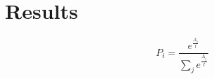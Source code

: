\thispagestyle{empty}
\pagestyle{empty}
\section{Results}


\begin{equation}\label{eq:prob}
P_{i} = \frac{e^{\frac{A_i}{t}}}{\sum_{j}e^{\frac{A_j}{t}}}
\end{equation}




